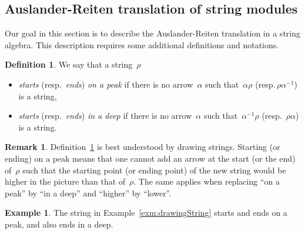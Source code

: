 \documentclass{memo-l}
\theoremstyle{definition}
\newtheorem{definition}[theorem]{Definition}
\newtheorem{example}[theorem]{Example}
\newtheorem{remark}[theorem]{Remark}
\newcommand{\darkblue}{\color{darkblue}} %
\newcommand{\defn}[1]{\textsl{\darkblue #1}} %
\begin{document}
\subsection{Auslander-Reiten translation of string modules}
\label{subsec:ARtranslationStringModules}

Our goal in this section is to describe the Auslander-Reiten translation in a string algebra.
This description requires some additional definitions and notations.

\begin{definition}
\label{def:peaksDeeps}
We say that a string~$\rho$
  \begin{itemize}
    \item \defn{starts} (resp.~\defn{ends}) \defn{on a peak} if there is no arrow~$\alpha$ such that~$\alpha \rho$ (resp.\,$\rho\alpha^{-1}$) is a string,
    \item \defn{starts} (resp.~\defn{ends}) \defn{in a deep} if there is no arrow~$\alpha$ such that~$\alpha^{-1} \rho$ (resp.~$\rho \alpha$) is a string.
  \end{itemize}
\end{definition} 

\begin{remark}
Definition~\ref{def:peaksDeeps} is best understood by drawing strings.  Starting (or ending) on a peak means that one cannot add an arrow at the start (or the end) of~$\rho$ such that the starting point (or ending point) of the new string would be higher in the picture than that of~$\rho$.  The same applies when replacing ``on a peak'' by ``in a deep'' and  ``higher'' by ``lower''.
\end{remark}

\begin{example}
The string in Example~\ref{exm:drawingString} starts and ends on a peak, and also ends in a deep.
\end{example}
\end{document}
